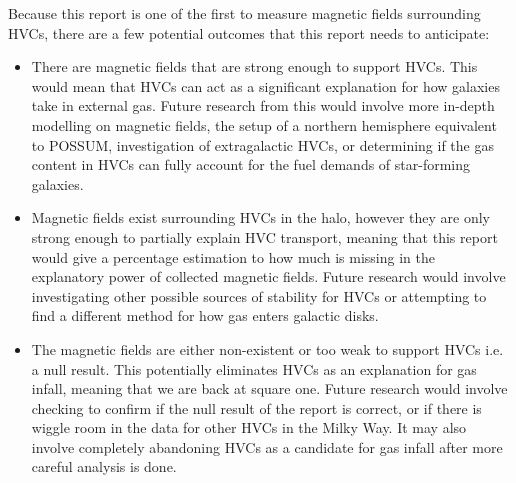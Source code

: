 Because this report is one of the first to measure magnetic fields surrounding HVCs, there are a few potential outcomes that this report needs to anticipate:
\begin{itemize}
\item There are magnetic fields that are strong enough to support HVCs. This would mean that HVCs can act as a significant explanation for how galaxies take in external gas. Future research from this would involve more in-depth modelling on magnetic fields, the setup of a northern hemisphere equivalent to POSSUM, investigation of extragalactic HVCs, or determining if the gas content in HVCs can fully account for the fuel demands of star-forming galaxies.
\item Magnetic fields exist surrounding HVCs in the halo, however they are only strong enough to partially explain HVC transport, meaning that this report would give a percentage estimation to how much is missing in the explanatory power of collected magnetic fields. Future research would involve investigating other possible sources of stability for HVCs or attempting to find a different method for how gas enters galactic disks.
\item The magnetic fields are either non-existent or too weak to support HVCs i.e. a null result. This potentially eliminates HVCs as an explanation for gas infall, meaning that we are back at square one. Future research would involve checking to confirm if the null result of the report is correct, or if there is wiggle room in the data for other HVCs in the Milky Way. It may also involve completely abandoning HVCs as a candidate for gas infall after more careful analysis is done.
\end{itemize}